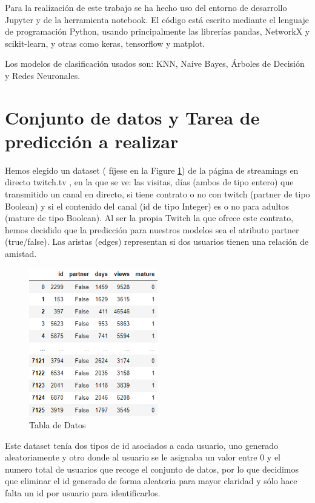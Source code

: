 \documentclass[12pt]{article}
\newcommand\tab[1][1cm]{\hspace*{#1}}
\begin{document}
Para la realización de este trabajo se ha hecho uso del entorno de desarrollo Jupyter y de la herramienta notebook. El código está escrito mediante el lenguaje de programación Python, usando principalmente las librerías pandas, NetworkX y scikit-learn, y otras como keras, tensorflow y matplot.



Los modelos de clasificación usados son: KNN, Naive Bayes, Árboles de Decisión y Redes Neuronales.



\section{Conjunto de datos y Tarea de predicción a realizar}
\tab[0,65cm]Hemos elegido un dataset ( fíjese en la Figure \ref{fig:dataset}) de la página de streamings en directo twitch.tv , en la que se ve: las visitas, días (ambos de tipo entero) que transmitido un canal en directo, si tiene contrato o no con twitch (partner de tipo Boolean) y si el contenido del canal (id de tipo Integer) es o no para adultos (mature de tipo Boolean). Al ser la propia Twitch la que ofrece este contrato, hemos decidido que la predicción para nuestros modelos sea el atributo partner (true/false). Las aristas (edges) representan si dos usuarios tienen una relación de amistad.

\begin{figure} %
    \centering
    \includegraphics[width=0.5\textwidth]{./ImagenesMemoria/dataset}
    \caption{\label{fig:dataset}Tabla de Datos}
\end{figure}

Este dataset tenía dos tipos de id asociados a cada usuario, uno generado aleatoriamente y otro donde al usuario se le asignaba un valor entre 0 y el numero total de usuarios que recoge el conjunto de datos, por lo que decidimos que eliminar el id generado de forma aleatoria para mayor claridad y sólo hace falta un id por usuario para identificarlos.
\end{document}
